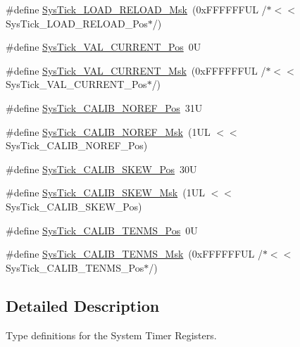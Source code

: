 \begin{DoxyCompactItemize}
\#define \mbox{\hyperlink{group___c_m_s_i_s___sys_tick_ga265912a7962f0e1abd170336e579b1b1}{Sys\+Tick\+\_\+\+L\+O\+A\+D\+\_\+\+R\+E\+L\+O\+A\+D\+\_\+\+Msk}}~(0x\+F\+F\+F\+F\+F\+F\+U\+L /$\ast$$<$$<$ Sys\+Tick\+\_\+\+L\+O\+A\+D\+\_\+\+R\+E\+L\+O\+A\+D\+\_\+\+Pos$\ast$/)
\item 
\#define \mbox{\hyperlink{group___c_m_s_i_s___sys_tick_ga3208104c3b019b5de35ae8c21d5c34dd}{Sys\+Tick\+\_\+\+V\+A\+L\+\_\+\+C\+U\+R\+R\+E\+N\+T\+\_\+\+Pos}}~0U
\item 
\#define \mbox{\hyperlink{group___c_m_s_i_s___sys_tick_gafc77b56d568930b49a2474debc75ab45}{Sys\+Tick\+\_\+\+V\+A\+L\+\_\+\+C\+U\+R\+R\+E\+N\+T\+\_\+\+Msk}}~(0x\+F\+F\+F\+F\+F\+F\+U\+L /$\ast$$<$$<$ Sys\+Tick\+\_\+\+V\+A\+L\+\_\+\+C\+U\+R\+R\+E\+N\+T\+\_\+\+Pos$\ast$/)
\item 
\#define \mbox{\hyperlink{group___c_m_s_i_s___sys_tick_ga534dbe414e7a46a6ce4c1eca1fbff409}{Sys\+Tick\+\_\+\+C\+A\+L\+I\+B\+\_\+\+N\+O\+R\+E\+F\+\_\+\+Pos}}~31U
\item 
\#define \mbox{\hyperlink{group___c_m_s_i_s___sys_tick_ga3af0d891fdd99bcc8d8912d37830edb6}{Sys\+Tick\+\_\+\+C\+A\+L\+I\+B\+\_\+\+N\+O\+R\+E\+F\+\_\+\+Msk}}~(1\+U\+L $<$$<$ Sys\+Tick\+\_\+\+C\+A\+L\+I\+B\+\_\+\+N\+O\+R\+E\+F\+\_\+\+Pos)
\item 
\#define \mbox{\hyperlink{group___c_m_s_i_s___sys_tick_gadd0c9cd6641b9f6a0c618e7982954860}{Sys\+Tick\+\_\+\+C\+A\+L\+I\+B\+\_\+\+S\+K\+E\+W\+\_\+\+Pos}}~30U
\item 
\#define \mbox{\hyperlink{group___c_m_s_i_s___sys_tick_ga8a6a85a87334776f33d77fd147587431}{Sys\+Tick\+\_\+\+C\+A\+L\+I\+B\+\_\+\+S\+K\+E\+W\+\_\+\+Msk}}~(1\+U\+L $<$$<$ Sys\+Tick\+\_\+\+C\+A\+L\+I\+B\+\_\+\+S\+K\+E\+W\+\_\+\+Pos)
\item 
\#define \mbox{\hyperlink{group___c_m_s_i_s___sys_tick_gacae558f6e75a0bed5d826f606d8e695e}{Sys\+Tick\+\_\+\+C\+A\+L\+I\+B\+\_\+\+T\+E\+N\+M\+S\+\_\+\+Pos}}~0U
\item 
\#define \mbox{\hyperlink{group___c_m_s_i_s___sys_tick_gaf1e68865c5aece2ad58971225bd3e95e}{Sys\+Tick\+\_\+\+C\+A\+L\+I\+B\+\_\+\+T\+E\+N\+M\+S\+\_\+\+Msk}}~(0x\+F\+F\+F\+F\+F\+F\+U\+L /$\ast$$<$$<$ Sys\+Tick\+\_\+\+C\+A\+L\+I\+B\+\_\+\+T\+E\+N\+M\+S\+\_\+\+Pos$\ast$/)
\end{DoxyCompactItemize}


\subsection{Detailed Description}
Type definitions for the System Timer Registers. 



